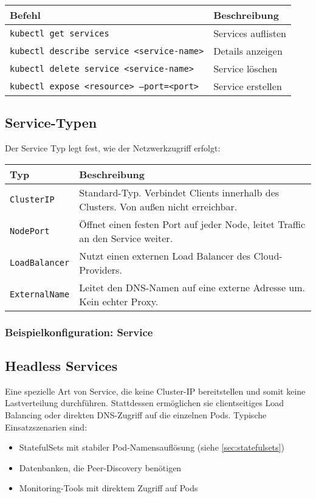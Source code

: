 \noindent
\begin{tabular}{|p{}|p{}|}
\hline
\textbf{Befehl} & \textbf{Beschreibung} \\
\hline
\texttt{kubectl get services} & Services auflisten \\
\texttt{kubectl describe service <service-name>} & Details anzeigen \\
\texttt{kubectl delete service <service-name>} & Service löschen \\
\texttt{kubectl expose <resource> --port=<port>} & Service erstellen\\
\hline
\end{tabular}

\subsection{Service-Typen}
Der Service Typ legt fest, wie der Netzwerkzugriff erfolgt:\\
\begin{tabular}{|p{}|p{}|}
\hline
\textbf{Typ} & \textbf{Beschreibung} \\
\hline
\texttt{ClusterIP} & Standard-Typ. Verbindet Clients innerhalb des Clusters. Von außen nicht erreichbar. \\
\texttt{NodePort} & Öffnet einen festen Port auf jeder Node, leitet Traffic an den Service weiter. \\
\texttt{LoadBalancer} & Nutzt einen externen Load Balancer des Cloud-Providers. \\
\texttt{ExternalName} & Leitet den DNS-Namen auf eine externe Adresse um. Kein echter Proxy. \\
\hline
\end{tabular}

\subsubsection{Beispielkonfiguration: Service}


\subsection{Headless Services}
\label{subsec:headless-service}
Eine spezielle Art von Service, die keine Cluster-IP bereitstellen und somit keine Lastverteilung durchführen. Stattdessen ermöglichen sie clientseitiges Load Balancing oder direkten DNS-Zugriff auf die einzelnen Pods.
Typische Einsatzszenarien sind:
\begin{itemize}
    \item StatefulSets mit stabiler Pod-Namensauflösung (siehe \ref{sec:statefulsets})
    \item Datenbanken, die Peer-Discovery benötigen
    \item Monitoring-Tools mit direktem Zugriff auf Pods
\end{itemize}
